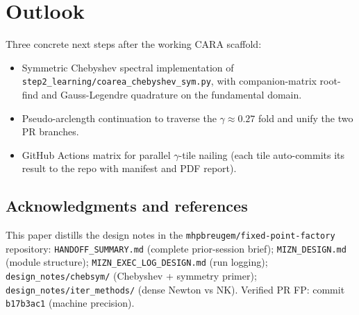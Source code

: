 \documentclass[10pt,twocolumn,a4paper]{article}
\begin{document}
\section{Outlook}

Three concrete next steps after the working CARA scaffold:
\begin{itemize}
\item Symmetric Chebyshev spectral implementation of
\texttt{step2\_learning/coarea\_chebyshev\_sym.py}, with companion-matrix
root-find and Gauss-Legendre quadrature on the fundamental domain.
\item Pseudo-arclength continuation to traverse the $\gamma \approx 0.27$
fold and unify the two PR branches.
\item GitHub Actions matrix for parallel $\gamma$-tile nailing (each tile
auto-commits its result to the repo with manifest and PDF report).
\end{itemize}

\subsection*{Acknowledgments and references}

This paper distills the design notes in the
\texttt{mhpbreugem/fixed-point-factory} repository:
\texttt{HANDOFF\_SUMMARY.md} (complete prior-session brief);
\texttt{MIZN\_DESIGN.md} (module structure);
\texttt{MIZN\_EXEC\_LOG\_DESIGN.md} (run logging);
\texttt{design\_notes/chebsym/} (Chebyshev + symmetry primer);
\texttt{design\_notes/iter\_methods/} (dense Newton vs NK).
Verified PR FP: commit \texttt{b17b3ac1} (machine precision).
\end{document}
